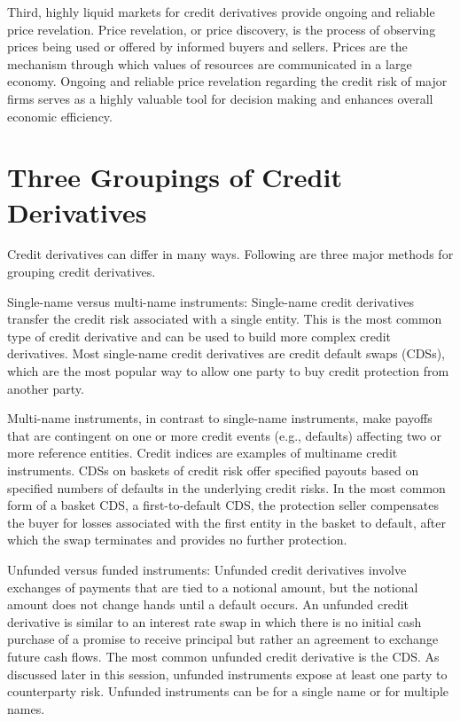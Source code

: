 \documentclass[11pt]{article}
\begin{document}
Third, highly liquid markets for credit derivatives provide ongoing and reliable price revelation. Price revelation, or price discovery, is the process of observing prices being used or offered by informed buyers and sellers. Prices are the mechanism through which values of resources are communicated in a large economy. Ongoing and reliable price revelation regarding the credit risk of major firms serves as a highly valuable tool for decision making and enhances overall economic efficiency.

\section*{Three Groupings of Credit Derivatives}
Credit derivatives can differ in many ways. Following are three major methods for grouping credit derivatives.

Single-name versus multi-name instruments: Single-name credit derivatives transfer the credit risk associated with a single entity. This is the most common type of credit derivative and can be used to build more complex credit derivatives. Most single-name credit derivatives are credit default swaps (CDSs), which are the most popular way to allow one party to buy credit protection from another party.

Multi-name instruments, in contrast to single-name instruments, make payoffs that are contingent on one or more credit events (e.g., defaults) affecting two or more reference entities. Credit indices are examples of multiname credit instruments. CDSs on baskets of credit risk offer specified payouts based on specified numbers of defaults in the underlying credit risks. In the most common form of a basket CDS, a first-to-default CDS, the protection seller compensates the buyer for losses associated with the first entity in the basket to default, after which the swap terminates and provides no further protection.

Unfunded versus funded instruments: Unfunded credit derivatives involve exchanges of payments that are tied to a notional amount, but the notional amount does not change hands until a default occurs. An unfunded credit derivative is similar to an interest rate swap in which there is no initial cash purchase of a promise to receive principal but rather an agreement to exchange future cash flows. The most common unfunded credit derivative is the CDS. As discussed later in this session, unfunded instruments expose at least one party to counterparty risk. Unfunded instruments can be for a single name or for multiple names.
\end{document}
